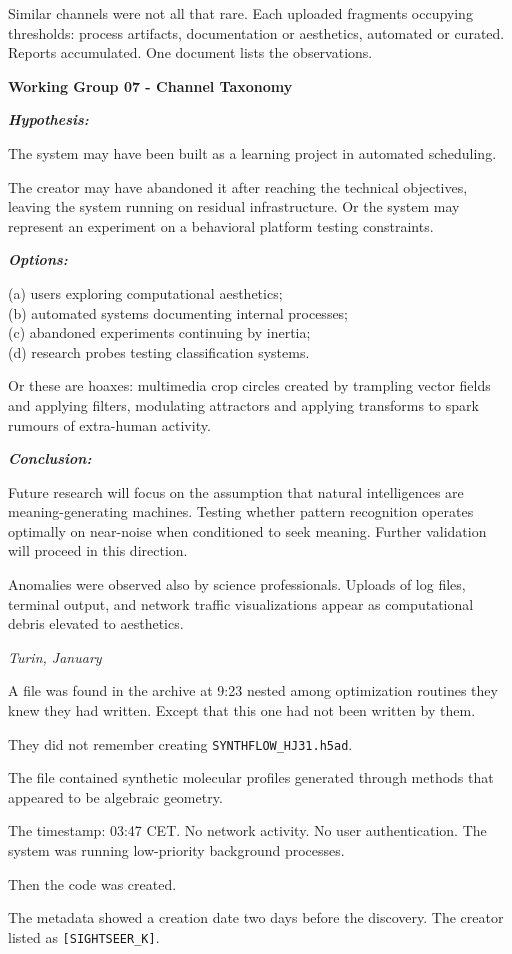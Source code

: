 Similar channels were not all that rare. Each uploaded fragments occupying thresholds: process artifacts, documentation or aesthetics, automated or curated. Reports accumulated. One document lists the observations.

\begin{archivefragment}
\textbf{Working Group 07 - Channel Taxonomy}

\noindent \textit{\textbf{Hypothesis:}}

The system may have been built as a learning project in automated scheduling.

The creator may have abandoned it after reaching the technical objectives, leaving the system running on residual infrastructure. Or the system may represent an experiment on a behavioral platform testing constraints.

\noindent \textit{\textbf{Options:}}

(a) users exploring computational aesthetics;\\
(b) automated systems documenting internal processes;\\
(c) abandoned experiments continuing by inertia;\\
(d) research probes testing classification systems.

Or these are hoaxes: multimedia crop circles created by trampling vector fields and applying filters, modulating attractors and applying transforms to spark rumours of extra-human activity.

\noindent \textit{\textbf{Conclusion:}}

Future research will focus on the assumption that natural intelligences are meaning-generating machines. Testing whether pattern recognition operates optimally on near-noise when conditioned to seek meaning. Further validation will proceed in this direction.

\end{archivefragment}

Anomalies were observed also by science professionals. Uploads of log files, terminal output, and network traffic visualizations appear as computational debris elevated to aesthetics.

\begin{archivefragment}
\textit{Turin, January}

A file was found in the archive at 9:23 nested among optimization routines they knew they had written. Except that this one had not been written by them.

They did not remember creating \texttt{SYNTHFLOW\_HJ31.h5ad}.

The file contained synthetic molecular profiles generated through methods that appeared to be algebraic geometry.

The timestamp: 03:47 CET. No network activity. No user authentication. The system was running low-priority background processes.

Then the code was created.

The metadata showed a creation date two days before the discovery. The creator listed as \texttt{[SIGHTSEER\_K]}.

\end{archivefragment}

